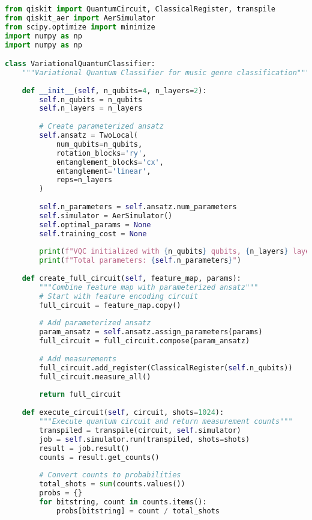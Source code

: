 \documentclass[11pt,a4paper]{article}
\begin{document}
\begin{lstlisting}[language=Python, caption=Complete VQC Implementation]
from qiskit import QuantumCircuit, ClassicalRegister, transpile
from qiskit_aer import AerSimulator
from scipy.optimize import minimize
import numpy as np
import numpy as np

class VariationalQuantumClassifier:
    """Variational Quantum Classifier for music genre classification"""
    
    def __init__(self, n_qubits=4, n_layers=2):
        self.n_qubits = n_qubits
        self.n_layers = n_layers
        
        # Create parameterized ansatz
        self.ansatz = TwoLocal(
            num_qubits=n_qubits,
            rotation_blocks='ry',
            entanglement_blocks='cx',
            entanglement='linear',
            reps=n_layers
        )
        
        self.n_parameters = self.ansatz.num_parameters
        self.simulator = AerSimulator()
        self.optimal_params = None
        self.training_cost = None
        
        print(f"VQC initialized with {n_qubits} qubits, {n_layers} layers")
        print(f"Total parameters: {self.n_parameters}")
    
    def create_full_circuit(self, feature_map, params):
        """Combine feature map with parameterized ansatz"""
        # Start with feature encoding circuit
        full_circuit = feature_map.copy()
        
        # Add parameterized ansatz
        param_ansatz = self.ansatz.assign_parameters(params)
        full_circuit = full_circuit.compose(param_ansatz)
        
        # Add measurements
        full_circuit.add_register(ClassicalRegister(self.n_qubits))
        full_circuit.measure_all()
        
        return full_circuit
    
    def execute_circuit(self, circuit, shots=1024):
        """Execute quantum circuit and return measurement counts"""
        transpiled = transpile(circuit, self.simulator)
        job = self.simulator.run(transpiled, shots=shots)
        result = job.result()
        counts = result.get_counts()
        
        # Convert counts to probabilities
        total_shots = sum(counts.values())
        probs = {}
        for bitstring, count in counts.items():
            probs[bitstring] = count / total_shots
            

\end{lstlisting}
\end{document}
